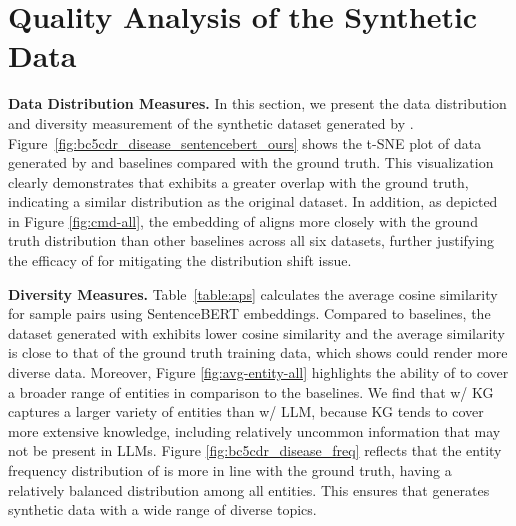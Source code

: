 \section{Quality Analysis of the Synthetic Data}
\label{sec:quality_analysis}
\textbf{Data Distribution Measures.}
In this section, we present the data distribution and diversity measurement of the synthetic dataset generated by {\ours}.
Figure~\ref{fig:bc5cdr_disease_sentencebert_ours} shows the t-SNE plot of data generated by {\ours} and baselines compared with the ground truth. This visualization clearly demonstrates that {\ours} exhibits a greater overlap with the ground truth, indicating a similar distribution as the original dataset.
In addition, as depicted in Figure \ref{fig:cmd-all}, the embedding of \textit{\ours} aligns more closely with the ground truth distribution than other baselines across all six datasets, further justifying the efficacy of {\ours} for mitigating the distribution shift issue.


\textbf{Diversity Measures.}
Table~\ref{table:aps} calculates the average cosine similarity for sample pairs using SentenceBERT embeddings.
Compared to baselines, the dataset generated with {\ours} exhibits lower cosine similarity and the average similarity is close to that of the ground truth training data, which shows {\ours} could render more diverse data.  
Moreover, Figure \ref{fig:avg-entity-all} highlights the ability of \textit{\ours} to cover a broader range of entities in comparison to the baselines. We find that {\ours} w/ KG captures a larger variety of entities than {\ours} w/ LLM, because KG tends to cover more extensive knowledge, including relatively uncommon information that may not be present in LLMs.
Figure \ref{fig:bc5cdr_disease_freq} reflects that the entity frequency distribution of {\ours} is more in line with the ground truth, having a relatively balanced distribution among all entities. This ensures that {\ours} generates synthetic data with a wide range of diverse topics.


\label{sec:diversity_measures}

